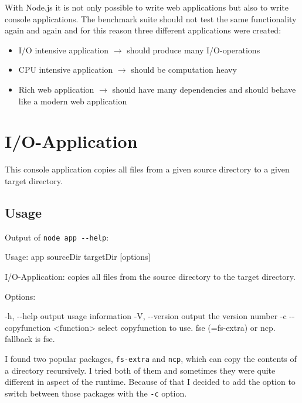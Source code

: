 With Node.js it is not only possible to write web applications but also to write console applications. The benchmark suite should not test the same functionality again and again and for this reason three different applications were created:
\begin{itemize}
	\item I/O intensive application $\rightarrow$ should produce many I/O-operations
	\item CPU intensive application $\rightarrow$ should be computation heavy
	\item Rich web application $\rightarrow$ should have many dependencies and should behave like a modern web application
\end{itemize}

\section{I/O-Application}
	This console application copies all files from a given source directory to a given target directory. 
	\subsection{Usage}
	Output of \texttt{node app -{}-help}:
	\par
	\begingroup
	\leftskip=1cm
	\noindent   Usage: app sourceDir targetDir [options]
	
	  I/O-Application: copies all files from the source directory to the target directory.
	
	  Options:
	
	    -h, -{}-help                    output usage information\newline
	    -V, -{}-version                 output the version number\newline
	    -c -{}-copyfunction <function>  select copyfunction to use. fse (=fs-extra) or ncp. fallback is fse.
	\par
	\endgroup
	
	I found two popular packages, \texttt{fs-extra}\citep{fs-extra} and \texttt{ncp}\citep{ncp}, which can copy the contents of a directory recursively. I tried both of them and sometimes they were  quite different in aspect of the runtime. Because of that I decided to add the option to switch between those packages with the \texttt{-c} option. 
	

